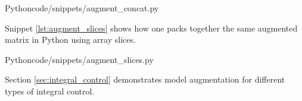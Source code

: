 \begin{code}{Python}{code/snippets/augment_concat.py}
  \caption{Matrix augmentation example: concatenation}
  \label{lst:augment_concat}
\end{code}

Snippet \ref{lst:augment_slices} shows how one packs together the same augmented
matrix in Python using array slices.

\begin{code}{Python}{code/snippets/augment_slices.py}
  \caption{Matrix augmentation example: array slices}
  \label{lst:augment_slices}
\end{code}

Section \ref{sec:integral_control} demonstrates \gls{model} augmentation for
different types of integral control.
